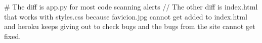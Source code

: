 # The diff is app.py for most code scanning alerts
// The other diff is index.html that works with styles.css because favicion.jpg cannot get added to index.html and heroku keeps giving out to check bugs and the bugs from the site cannot get fixed.
